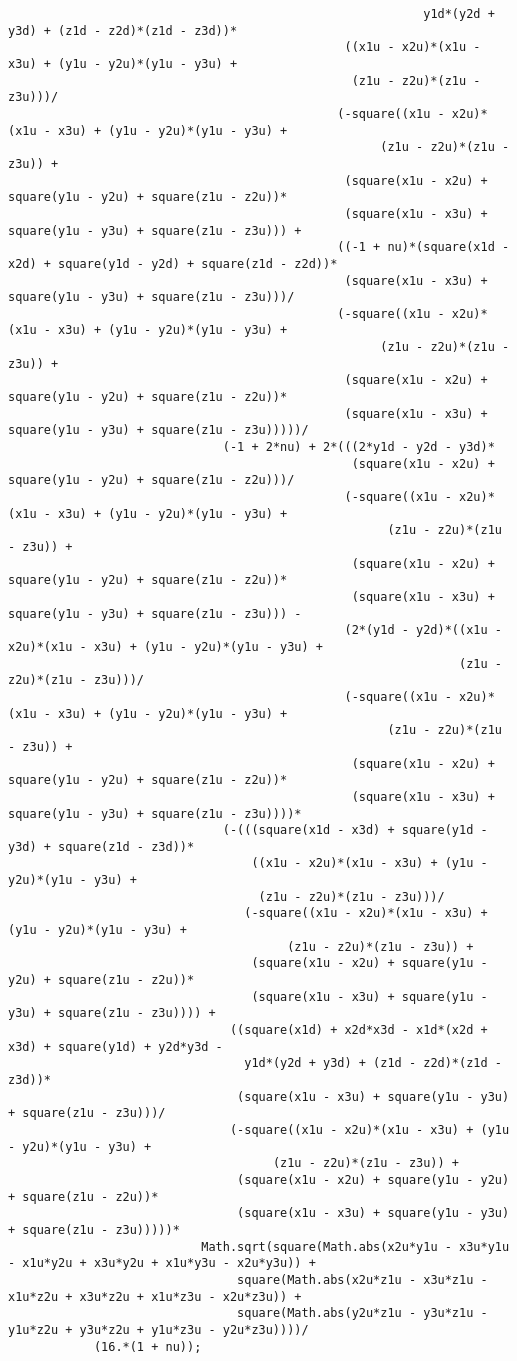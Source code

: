 \begin{lstlisting}
														  y1d*(y2d + y3d) + (z1d - z2d)*(z1d - z3d))*
											   ((x1u - x2u)*(x1u - x3u) + (y1u - y2u)*(y1u - y3u) + 
												(z1u - z2u)*(z1u - z3u)))/
											  (-square((x1u - x2u)*(x1u - x3u) + (y1u - y2u)*(y1u - y3u) + 
													(z1u - z2u)*(z1u - z3u)) + 
											   (square(x1u - x2u) + square(y1u - y2u) + square(z1u - z2u))*
											   (square(x1u - x3u) + square(y1u - y3u) + square(z1u - z3u))) + 
											  ((-1 + nu)*(square(x1d - x2d) + square(y1d - y2d) + square(z1d - z2d))*
											   (square(x1u - x3u) + square(y1u - y3u) + square(z1u - z3u)))/
											  (-square((x1u - x2u)*(x1u - x3u) + (y1u - y2u)*(y1u - y3u) + 
													(z1u - z2u)*(z1u - z3u)) + 
											   (square(x1u - x2u) + square(y1u - y2u) + square(z1u - z2u))*
											   (square(x1u - x3u) + square(y1u - y3u) + square(z1u - z3u)))))/
							  (-1 + 2*nu) + 2*(((2*y1d - y2d - y3d)*
												(square(x1u - x2u) + square(y1u - y2u) + square(z1u - z2u)))/
											   (-square((x1u - x2u)*(x1u - x3u) + (y1u - y2u)*(y1u - y3u) + 
													 (z1u - z2u)*(z1u - z3u)) + 
												(square(x1u - x2u) + square(y1u - y2u) + square(z1u - z2u))*
												(square(x1u - x3u) + square(y1u - y3u) + square(z1u - z3u))) - 
											   (2*(y1d - y2d)*((x1u - x2u)*(x1u - x3u) + (y1u - y2u)*(y1u - y3u) + 
															   (z1u - z2u)*(z1u - z3u)))/
											   (-square((x1u - x2u)*(x1u - x3u) + (y1u - y2u)*(y1u - y3u) + 
													 (z1u - z2u)*(z1u - z3u)) + 
												(square(x1u - x2u) + square(y1u - y2u) + square(z1u - z2u))*
												(square(x1u - x3u) + square(y1u - y3u) + square(z1u - z3u))))*
							  (-(((square(x1d - x3d) + square(y1d - y3d) + square(z1d - z3d))*
								  ((x1u - x2u)*(x1u - x3u) + (y1u - y2u)*(y1u - y3u) + 
								   (z1u - z2u)*(z1u - z3u)))/
								 (-square((x1u - x2u)*(x1u - x3u) + (y1u - y2u)*(y1u - y3u) + 
									   (z1u - z2u)*(z1u - z3u)) + 
								  (square(x1u - x2u) + square(y1u - y2u) + square(z1u - z2u))*
								  (square(x1u - x3u) + square(y1u - y3u) + square(z1u - z3u)))) + 
							   ((square(x1d) + x2d*x3d - x1d*(x2d + x3d) + square(y1d) + y2d*y3d - 
								 y1d*(y2d + y3d) + (z1d - z2d)*(z1d - z3d))*
								(square(x1u - x3u) + square(y1u - y3u) + square(z1u - z3u)))/
							   (-square((x1u - x2u)*(x1u - x3u) + (y1u - y2u)*(y1u - y3u) + 
									 (z1u - z2u)*(z1u - z3u)) + 
								(square(x1u - x2u) + square(y1u - y2u) + square(z1u - z2u))*
								(square(x1u - x3u) + square(y1u - y3u) + square(z1u - z3u)))))*
						   Math.sqrt(square(Math.abs(x2u*y1u - x3u*y1u - x1u*y2u + x3u*y2u + x1u*y3u - x2u*y3u)) + 
								square(Math.abs(x2u*z1u - x3u*z1u - x1u*z2u + x3u*z2u + x1u*z3u - x2u*z3u)) + 
								square(Math.abs(y2u*z1u - y3u*z1u - y1u*z2u + y3u*z2u + y1u*z3u - y2u*z3u))))/
			(16.*(1 + nu));
			

\end{lstlisting}
